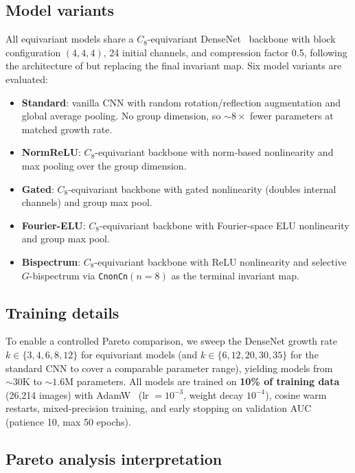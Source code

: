 \documentclass{article}
\theoremstyle{definition}
\theoremstyle{remark}
\theoremstyle{definition}
\begin{document}
\subsection{Model variants}

All equivariant models share a $C_8$-equivariant
DenseNet~\citep{huang2017densenet} backbone with block configuration
$(4, 4, 4)$, 24 initial channels, and compression factor 0.5,
following the architecture of \citet{veeling2018rotation} but
replacing the final invariant map. Six model variants are evaluated:

\begin{itemize}
  \item \textbf{Standard}: vanilla CNN with random rotation/reflection
    augmentation and global average pooling. No group dimension,
    so ${\sim}8\times$ fewer parameters at matched growth rate.
  \item \textbf{NormReLU}: $C_8$-equivariant backbone with norm-based
    nonlinearity and max pooling over the group dimension.
  \item \textbf{Gated}: $C_8$-equivariant backbone with gated
    nonlinearity (doubles internal channels) and group max pool.
  \item \textbf{Fourier-ELU}: $C_8$-equivariant backbone with
    Fourier-space ELU nonlinearity and group max pool.
  \item \textbf{Bispectrum}: $C_8$-equivariant backbone with ReLU
    nonlinearity and selective $G$-bispectrum via
    \texttt{CnonCn}$(n{=}8)$ as the terminal invariant map.
\end{itemize}

\subsection{Training details}

To enable a controlled Pareto comparison, we sweep the DenseNet
growth rate $k \in \{3, 4, 6, 8, 12\}$ for equivariant models (and
$k \in \{6, 12, 20, 30, 35\}$ for the standard CNN to cover a
comparable parameter range), yielding models from ${\sim}30$K to
${\sim}1.6$M parameters. All models are trained on \textbf{10\% of
training data} (26{,}214 images) with AdamW~\citep{loshchilov2019adamw}
(lr $= 10^{-3}$, weight decay $10^{-4}$), cosine warm restarts,
mixed-precision training, and early stopping on validation AUC
(patience 10, max 50 epochs).

\subsection{Pareto analysis interpretation}
\end{document}
